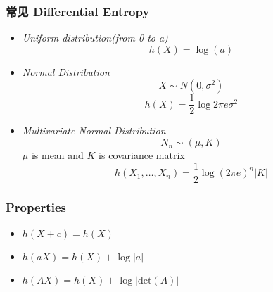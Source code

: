 \documentclass{article} 	%
\begin{document}
		\subsubsection{常见 Differential Entropy}
			\begin{itemize}
			       \item
            		       \emph{Uniform distribution(from 0 to a)}
                                \[
                                h(X) = \log(a)
                                \]
                                
                                \item
                                \emph{Normal Distribution}
                                \[
                                 X\sim N(0,\sigma^2)
                                 \]
                                 \[
                                 h(X) = \frac{1}{2} \log2\pi e \sigma^2 
                                \]
                                
                                \item
                                \emph{Multivariate Normal Distribution}
                                $$N_n\sim(\mu, K)$$
                                $\mu$ is mean and $K$ is covariance matrix
                                \[
                                h(X_1,\ldots,X_n) = \frac{1}{2}\log(2\pi e )^n |K|
                                \]
			\end{itemize}
			
		\subsubsection{Properties}
                        \begin{itemize}
                                \item $h(X+c) = h(X)$\\
                                \item$h(aX) = h(X) + \log|a|$\\
                                \item$h(AX) = h(X) + \log\big|\mathrm{det}(A)\big|$
                        \end{itemize}
\end{document}
